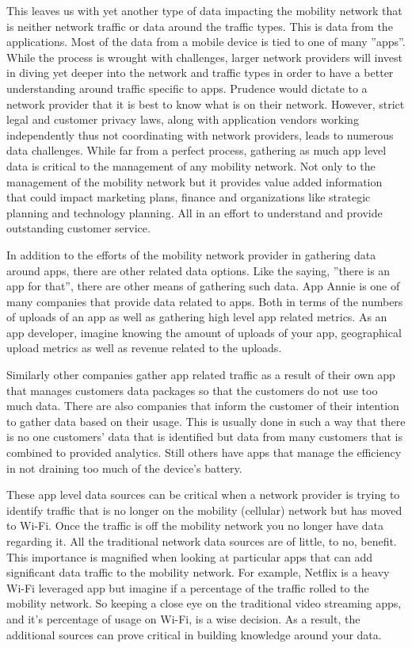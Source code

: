 \documentclass[sigconf]{acmart}
\begin{document}
This leaves us with yet another type of data impacting the mobility network that is neither network traffic or data around the traffic types.  This is data from the applications.  Most of the data from a mobile device is tied to one of many ''apps''.  While the process is wrought with challenges, larger network providers will invest in diving yet deeper into the network and traffic types in order to have a better understanding around traffic specific to apps.  Prudence would dictate to a network provider that it is best to know what is on their network.  However, strict legal and customer privacy laws, along with application vendors working independently thus not coordinating with network providers, leads to numerous data challenges.  While far from a perfect process, gathering as much app level data is critical to the management of any mobility network.  Not only to the management of the mobility network but it provides value added information that could impact marketing plans, finance and organizations like strategic planning and technology planning.  All in an effort to understand and provide outstanding customer service.

In addition to the efforts of the mobility network provider in gathering data around apps, there are other related data options.  Like the saying, ''there is an app for that'', there are other means of gathering such data.  App Annie is one of many companies that provide data related to apps.  Both in terms of the numbers of uploads of an app as well as gathering high level app related metrics. As an app developer, imagine knowing the amount of uploads of your app, geographical upload metrics as well as revenue related to the uploads.   

Similarly other companies gather app related traffic as a result of their own app that manages customers data packages so that the customers do not use too much data.  There are also companies that inform the customer of their intention to gather data based on their usage.  This is usually done in such a way that there is no one customers' data that is identified but data from many customers that is combined to provided analytics.  Still others have apps that manage the efficiency in not draining too much of the device's battery. 

These app level data sources can be critical when a network provider is trying to identify traffic that is no longer on the mobility (cellular) network but has moved to Wi-Fi.  Once the traffic is off the mobility network you no longer have data regarding it.  All the traditional network data sources are of little, to no, benefit.  This importance is magnified when looking at particular apps that can add significant data traffic to the mobility network.  For example, Netflix is a heavy Wi-Fi leveraged app but imagine if a percentage of the traffic rolled to the mobility network.  So keeping a close eye on the traditional video streaming apps, and it's percentage of usage on Wi-Fi, is a wise decision. As a result, the additional sources can prove critical in building knowledge around your data.
\end{document}
